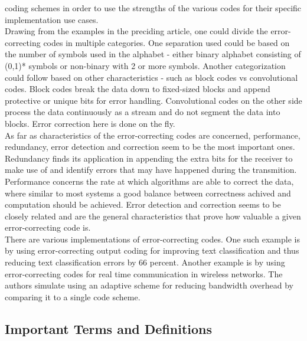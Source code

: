 \documentclass[12pt]%
{article}
\begin{document}
coding schemes in order to use the strengths of the various codes for their specific implementation use cases. \\
Drawing from the examples in the preciding article, one could divide the error-correcting codes in multiple categories. One separation used could be based on the number of symbols used in the alphabet - either binary alphabet consisting of (0,1)* symbols or non-binary with 2 or more symbols. Another categorization could follow based on other characteristics - such as block codes vs convolutional codes. Block codes break the data down to fixed-sized blocks and append protective or unique bits for error handling. Convolutional codes on the other side process the data continuously as a stream and do not segment the data into blocks. Error correction here is done on the fly. \\
As far as characteristics of the error-correcting codes are concerned, performance, redundancy, error detection and correction seem to be the most important ones. Redundancy finds its application in appending the extra bits for the receiver to make use of and identify errors that may have happened during the transmition. Performance concerns the rate at which algorithms are able to correct the data, where similar to most systems a good balance between correctness achived and computation should be achieved. Error detection and correction seems to be closely related and are the general characteristics that prove how valuable a given error-correcting code is. \\
There are various implementations of error-correcting codes. One such example is by using error-correcting output coding for improving text classification and thus reducing text classification errors by 66 percent.\cite{ghani2000using} Another example is by using error-correcting codes for real time communication in wireless networks. \cite{elaoud1998adaptive} The authors simulate using an adaptive scheme for reducing bandwidth overhead by comparing it to a single code scheme.


\subsection{Important Terms and Definitions}
\end{document}
